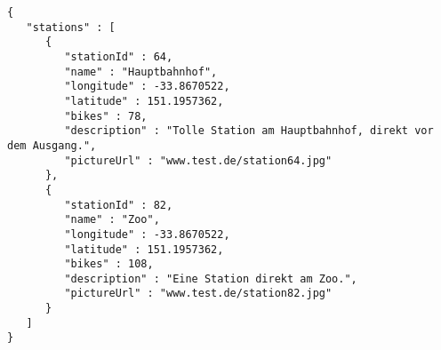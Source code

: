 \begin{verbatim}
{
   "stations" : [
      {
         "stationId" : 64,
         "name" : "Hauptbahnhof",
         "longitude" : -33.8670522,
         "latitude" : 151.1957362,
         "bikes" : 78,
         "description" : "Tolle Station am Hauptbahnhof, direkt vor dem Ausgang.",
         "pictureUrl" : "www.test.de/station64.jpg"
      },
      {
         "stationId" : 82,
         "name" : "Zoo",
         "longitude" : -33.8670522,
         "latitude" : 151.1957362,
         "bikes" : 108,
         "description" : "Eine Station direkt am Zoo.",
         "pictureUrl" : "www.test.de/station82.jpg"
      }
   ]
}
\end{verbatim}

